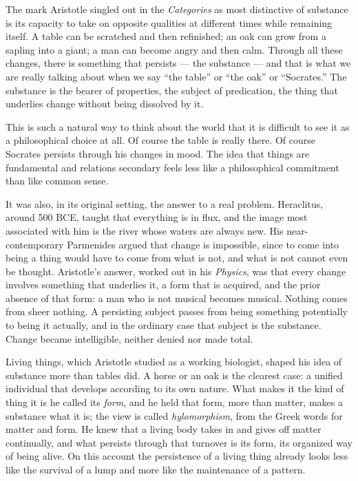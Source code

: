 The mark Aristotle singled out in the \textit{Categories} as most distinctive of substance is its capacity to take on opposite qualities at different times while remaining itself. A table can be scratched and then refinished; an oak can grow from a sapling into a giant; a man can become angry and then calm. Through all these changes, there is something that persists --- the substance --- and that is what we are really talking about when we say ``the table'' or ``the oak'' or ``Socrates.'' The substance is the bearer of properties, the subject of predication, the thing that underlies change without being dissolved by it.

This is such a natural way to think about the world that it is difficult to see it as a philosophical choice at all. Of course the table is really there. Of course Socrates persists through his changes in mood. The idea that things are fundamental and relations secondary feels less like a philosophical commitment than like common sense.

It was also, in its original setting, the answer to a real problem. Heraclitus, around 500 BCE, taught that everything is in flux, and the image most associated with him is the river whose waters are always new. His near-contemporary Parmenides argued that change is impossible, since to come into being a thing would have to come from what is not, and what is not cannot even be thought. Aristotle's answer, worked out in his \textit{Physics}, was that every change involves something that underlies it, a form that is acquired, and the prior absence of that form: a man who is not musical becomes musical. Nothing comes from sheer nothing. A persisting subject passes from being something potentially to being it actually, and in the ordinary case that subject is the substance. Change became intelligible, neither denied nor made total.

Living things, which Aristotle studied as a working biologist, shaped his idea of substance more than tables did. A horse or an oak is the clearest case: a unified individual that develops according to its own nature. What makes it the kind of thing it is he called its \emph{form}, and he held that form, more than matter, makes a substance what it is; the view is called \emph{hylomorphism}, from the Greek words for matter and form. He knew that a living body takes in and gives off matter continually, and what persists through that turnover is its form, its organized way of being alive. On this account the persistence of a living thing already looks less like the survival of a lump and more like the maintenance of a pattern.

